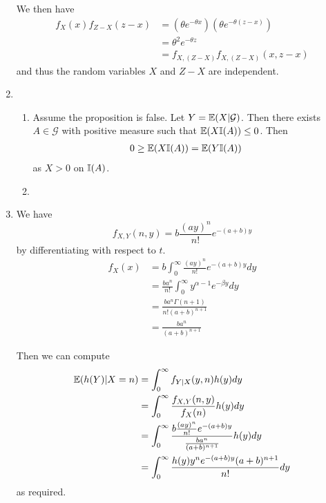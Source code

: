 \begin{enumerate}
  We then have
  \begin{align}
    \label{eq:9}
    f_{X}(x) f_{Z-X}(z-x) &= \left(\theta e^{-\theta x} \right)
    \left(\theta e^{-\theta (z -x)} \right) \\
    &= \theta^{2} e^{-\theta z} \\
    &= f_{X, (Z-X)} f_{X, (Z-X)}(x, z-x)
  \end{align} and thus the random variables $X$ and $Z-X$ are
  independent.

\item
  \begin{enumerate}
  \item Assume the proposition is false. Let $Y = \E{X |
      \mathcal{G}}$. Then there exists $A \in \mathcal{G}$ with
    positive measure such that $\E{X \I{A}} \leq 0$. Then
    \begin{align}
      \label{eq:8}
      0 \geq \E{X \I{A}} &= \E{Y \I{A}}
    \end{align} as $X > 0$ on $\I{A}$.
  \item {}
  \end{enumerate}


\item We have
  \begin{equation}
    \label{eq:12}
    f_{X, Y}(n, y) = b \frac{(ay)^{n}}{n!} e^{-(a+b)y}
  \end{equation} by differentiating with respect to $t$.
  \begin{align}
    \label{eq:10}
    f_{X}(x) &= b \int_{0}^{\infty} \frac{(ay)^{n}}{n!} e^{-(a+b)y} dy
    \\
    &= \frac{ba^{n}}{n!} \int_{0}^{\infty} y^{\alpha - 1} e^{-\beta y}
    dy \\
    &= \frac{ba^{n} \Gamma(n+1)}{n! (a+b)^{n+1}} \\
    &= \frac{ba^{n}}{(a+b)^{n+1}}
  \end{align}

  Then we can compute
  \begin{align}
    \label{eq:11}
    \E{h(Y) | X = n} &= \int_{0}^{\infty} f_{Y|X}(y, n) h(y) dy \\
    &= \int_{0}^{\infty} \frac{f_{X, Y}(n, y)}{f_{X}(n)} h(y) dy \\
    &= \int_{0}^{\infty} \frac{b \frac{(ay)^{n}}{n!} e^{-(a+b)
        y}}{\frac{ba^{n}}{(a+b)^{n+1}}} h(y) dy \\
    &= \int_{0}^{\infty} \frac{h(y) y^{n} e^{-(a+b)y}(a+b)^{n+1}}{n!}
    dy
  \end{align}
  as required.


\end{enumerate}

